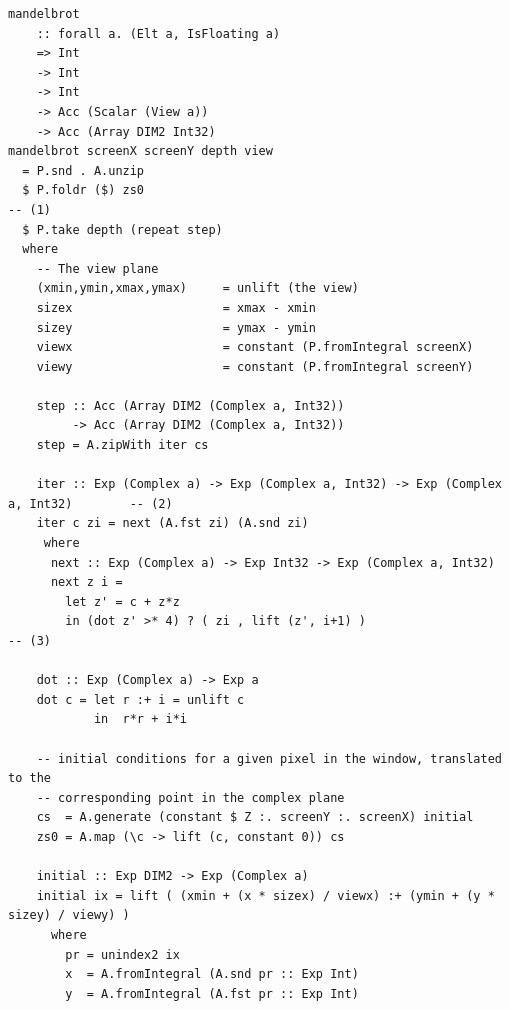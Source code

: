 \begin{lstlisting}[style=haskell_float
    ,label=lst:mandelbrot
    ,caption={Mandelbrot set generator, using fixed unrolling}]
mandelbrot
    :: forall a. (Elt a, IsFloating a)
    => Int
    -> Int
    -> Int
    -> Acc (Scalar (View a))
    -> Acc (Array DIM2 Int32)
mandelbrot screenX screenY depth view
  = P.snd . A.unzip
  $ P.foldr ($) zs0                                                                    -- (1)
  $ P.take depth (repeat step)
  where
    -- The view plane
    (xmin,ymin,xmax,ymax)     = unlift (the view)
    sizex                     = xmax - xmin
    sizey                     = ymax - ymin
    viewx                     = constant (P.fromIntegral screenX)
    viewy                     = constant (P.fromIntegral screenY)

    step :: Acc (Array DIM2 (Complex a, Int32))
         -> Acc (Array DIM2 (Complex a, Int32))
    step = A.zipWith iter cs

    iter :: Exp (Complex a) -> Exp (Complex a, Int32) -> Exp (Complex a, Int32)        -- (2)
    iter c zi = next (A.fst zi) (A.snd zi)
     where
      next :: Exp (Complex a) -> Exp Int32 -> Exp (Complex a, Int32)
      next z i =
        let z' = c + z*z
        in (dot z' >* 4) ? ( zi , lift (z', i+1) )                                     -- (3)

    dot :: Exp (Complex a) -> Exp a
    dot c = let r :+ i = unlift c
            in  r*r + i*i

    -- initial conditions for a given pixel in the window, translated to the
    -- corresponding point in the complex plane
    cs  = A.generate (constant $ Z :. screenY :. screenX) initial
    zs0 = A.map (\c -> lift (c, constant 0)) cs

    initial :: Exp DIM2 -> Exp (Complex a)
    initial ix = lift ( (xmin + (x * sizex) / viewx) :+ (ymin + (y * sizey) / viewy) )
      where
        pr = unindex2 ix
        x  = A.fromIntegral (A.snd pr :: Exp Int)
        y  = A.fromIntegral (A.fst pr :: Exp Int)
\end{lstlisting}

